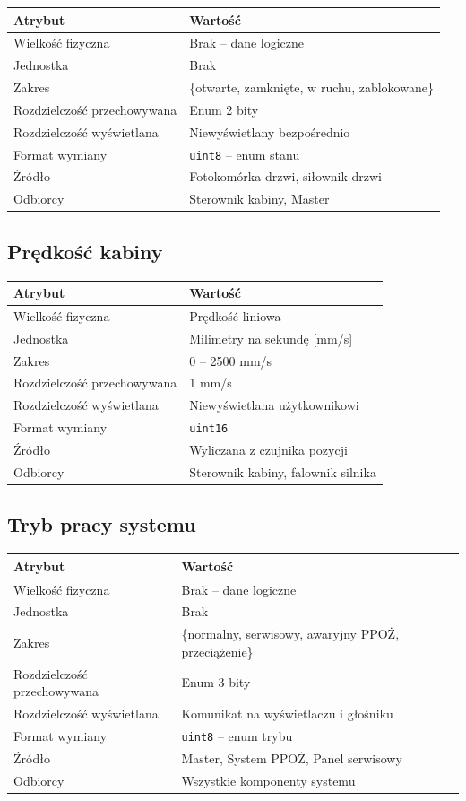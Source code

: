 \documentclass[12pt,a4paper]{article}
\begin{document}
\begin{tabularx}{\textwidth}{lX}
\toprule
\textbf{Atrybut} & \textbf{Wartość} \\
\midrule
Wielkość fizyczna & Brak -- dane logiczne \\
Jednostka & Brak \\
Zakres & \{otwarte, zamknięte, w ruchu, zablokowane\} \\
Rozdzielczość przechowywana & Enum 2 bity \\
Rozdzielczość wyświetlana & Niewyświetlany bezpośrednio \\
Format wymiany & \texttt{uint8} -- enum stanu \\
Źródło & Fotokomórka drzwi, siłownik drzwi \\
Odbiorcy & Sterownik kabiny, Master \\
\bottomrule
\end{tabularx}

\subsection{Prędkość kabiny}

\begin{tabularx}{\textwidth}{lX}
\toprule
\textbf{Atrybut} & \textbf{Wartość} \\
\midrule
Wielkość fizyczna & Prędkość liniowa \\
Jednostka & Milimetry na sekundę [mm/s] \\
Zakres & 0 -- 2500 mm/s \\
Rozdzielczość przechowywana & 1 mm/s \\
Rozdzielczość wyświetlana & Niewyświetlana użytkownikowi \\
Format wymiany & \texttt{uint16} \\
Źródło & Wyliczana z czujnika pozycji \\
Odbiorcy & Sterownik kabiny, falownik silnika \\
\bottomrule
\end{tabularx}

\subsection{Tryb pracy systemu}

\begin{tabularx}{\textwidth}{lX}
\toprule
\textbf{Atrybut} & \textbf{Wartość} \\
\midrule
Wielkość fizyczna & Brak -- dane logiczne \\
Jednostka & Brak \\
Zakres & \{normalny, serwisowy, awaryjny PPOŻ, przeciążenie\} \\
Rozdzielczość przechowywana & Enum 3 bity \\
Rozdzielczość wyświetlana & Komunikat na wyświetlaczu i głośniku \\
Format wymiany & \texttt{uint8} -- enum trybu \\
Źródło & Master, System PPOŻ, Panel serwisowy \\
Odbiorcy & Wszystkie komponenty systemu \\
\bottomrule
\end{tabularx}
\end{document}
